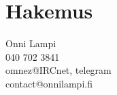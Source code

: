 \documentclass[a4paper, 12pt, finnish]{report}
\begin{document}
\chapter{Hakemus}
Onni Lampi\\
040 702 3841\\
omnez@IRCnet, telegram\\
contact@onnilampi.fi
\end{document}
